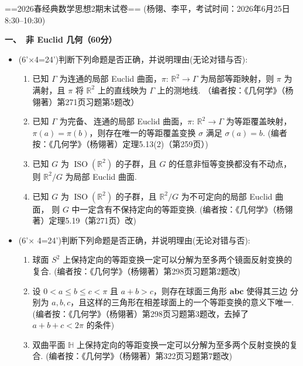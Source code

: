 
==2026春经典数学思想2期末试卷==
(杨翎、李平，考试时间：2026年6月25日8:30--10:30)

\textbf{一、\ 非 Euclid 几何（60分）}
\begin{itemize}
\item[1.](6'$\times$4=24')判断下列命题是否正确，并说明理由(无论对错与否):
\begin{enumerate}
\item[(1)]已知 $\Gamma$ 为连通的局部 Euclid 曲面，$\pi:\,\mathbb{R}^2\rightarrow\Gamma$ 
为局部等距映射，则 $\pi$ 为满射，且 $\pi$ 将 $\mathbb{R}^2$ 上的直线映为 $\Gamma$ 上的测地线. （编者按：《几何学》（杨翎著）第271页习题第5题改）
\item[(2)]已知 $\Gamma$ 为完备、\,连通的局部 Euclid 曲面，$\pi:\,\mathbb{R}^2\rightarrow\Gamma$ 为等距覆盖映射，
$\pi(a)=\pi(b)$，则存在唯一的等距覆盖变换 $\sigma$ 满足 $\sigma(a)=b$. (编者按：《几何学》（杨翎著）定理5.13(2)（第259页）)
\item[(3)]已知 $G$ 为 $\operatorname{ISO}(\mathbb{R}^2)$ 的子群，且 $G$ 的任意非恒等变换都没有不动点，则 $\mathbb{R}^2/G$ 为局部 Euclid 曲面.
\item[(4)]已知 $G$ 为 $\operatorname{ISO}(\mathbb{R}^2)$ 的子群，且 $\mathbb{R}^2/G$ 为不可定向的局部 Euclid 曲面，
则 $G$ 中一定含有不保持定向的等距变换. (编者按：《几何学》（杨翎著）定理5.19（第271页）改)
\end{enumerate}
\item[2.](6'$\times$ 4=24')判断下列命题是否正确，并说明理由(无论对错与否):
\begin{enumerate}
\item[(1)]球面 $S^2$ 上保持定向的等距变换一定可以分解为至多两个镜面反射变换的复合. (编者按：《几何学》（杨翎著）第298页习题第2题改)
\item[(2)]设 $0<a\leq b\leq c<π$ 且 $a+b>c$，则存在球面三角形 $\boldsymbol{a}\boldsymbol{b}\boldsymbol{c}$ 使得其三边
分别为 $a,b,c$，且这样的三角形在相差球面上的一个等距变换的意义下唯一. (编者按：《几何学》（杨翎著）第298页习题第3题改，去掉了 $a+b+c<2\pi$ 的条件)
\item[(3)]双曲平面 $\mathbb{H}$ 上保持定向的等距变换一定可以分解为至多两个反射变换的复合. (编者按：《几何学》（杨翎著）第322页习题第7题改)

\end{enumerate}
\end{itemize}
